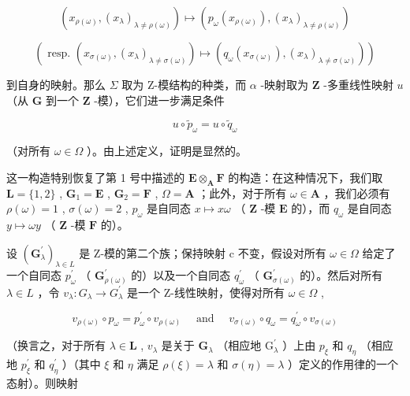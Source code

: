 \[
\left(x _ {\rho (\omega)}, \left(x _ {\lambda}\right) _ {\lambda \neq \rho (\omega)}\right) \mapsto \left(p _ {\omega} \left(x _ {\rho (\omega)}\right), \left(x _ {\lambda}\right) _ {\lambda \neq \rho (\omega)}\right)
\]

\[
\left(\text { resp. } \left(x _ {\sigma (\omega)}, \left(x _ {\lambda}\right) _ {\lambda \neq \sigma (\omega)}\right) \mapsto \left(q _ {\omega} (x _ {\sigma (\omega)}), \left(x _ {\lambda}\right) _ {\lambda \neq \sigma (\omega)}\right)\right)
\]

到自身的映射。那么 \(\Sigma\) 取为 Z-模结构的种类，而 \(\alpha\) -映射取为 \(\mathbf{Z}\) -多重线性映射 \(u\) （从 \(\mathbf{G}\) 到一个 \(\mathbf{Z}\) -模），它们进一步满足条件

\[
u \circ \tilde {p} _ {\omega} = u \circ \tilde {q} _ {\omega}\tag{26}
\]

（对所有 \(\omega \in \Omega\) ）。由上述定义，证明是显然的。

这一构造特别恢复了第 1 号中描述的 \(\mathbf{E} \otimes_{\mathbf{A}} \mathbf{F}\) 的构造：在这种情况下，我们取 \(\mathbf{L} = \{1, 2\}\) , \(\mathbf{G}_1 = \mathbf{E}\) , \(\mathbf{G}_2 = \mathbf{F}\) , \(\Omega = \mathbf{A}\) ；此外，对于所有 \(\omega \in \mathbf{A}\) ，我们必须有 \(\rho(\omega) = 1\) , \(\sigma(\omega) = 2\) , \(p_\omega\) 是自同态 \(x \mapsto x\omega\) （ \(\mathbf{Z}\) -模 \(\mathbf{E}\) 的），而 \(q_\omega\) 是自同态 \(y \mapsto \omega y\) （ \(\mathbf{Z}\) -模 \(\mathbf{F}\) 的）。

设 \((\mathbf{G}_{\lambda}^{\prime})_{\lambda \in L}\) 是 Z-模的第二个族；保持映射 c 不变，假设对所有 \(\omega \in \Omega\) 给定了一个自同态 \(p_{\omega}^{\prime}\) （ \(\mathbf{G}_{\rho(\omega)}^{\prime}\) 的）以及一个自同态 \(q_{\omega}^{\prime}\) （ \(\mathbf{G}_{\sigma(\omega)}^{\prime}\) 的）。然后对所有 \(\lambda \in L\) ，令 \(v_{\lambda}: G_{\lambda} \to G_{\lambda}^{\prime}\) 是一个 Z-线性映射，使得对所有 \(\omega \in \Omega\) ,

\[
v _ {\rho (\omega)} \circ p _ {\omega} = p _ {\omega} ^ {\prime} \circ v _ {\rho (\omega)} \quad \text { and } \quad v _ {\sigma (\omega)} \circ q _ {\omega} = q _ {\omega} ^ {\prime} \circ v _ {\sigma (\omega)}\tag{27}
\]

（换言之，对于所有 \(\lambda \in \mathbf{L}\) , \(v_{\lambda}\) 是关于 \(\mathbf{G}_{\lambda}\) （相应地 \(\mathrm{G}_{\lambda}^{\prime}\) ）上由 \(p_{\xi}\) 和 \(q_{\eta}\) （相应地 \(p_{\xi}^{\prime}\) 和 \(q_{\eta}^{\prime}\) ）（其中 \(\xi\) 和 \(\eta\) 满足 \(\rho(\xi) = \lambda\) 和 \(\sigma(\eta) = \lambda\) ）定义的作用律的一个态射）。则映射

